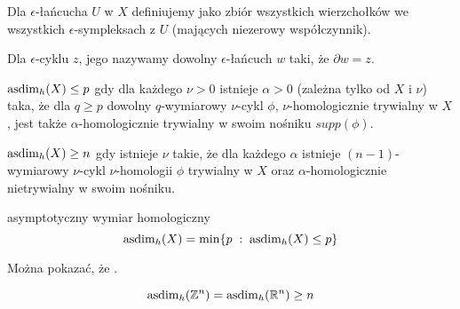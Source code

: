 Dla $\epsilon$-łańcucha $U$ w $X$ definiujemy  jako zbiór wszystkich wierzchołków we wszystkich $\epsilon$-sympleksach z $U$ (mających niezerowy współczynnik).

Dla $\epsilon$-cyklu $z$, jego  nazywamy dowolny $\epsilon$-łańcuch $w$ taki, że $\partial w=z$.



  $\operatorname{asdim}_h(X)\leq p$ gdy dla każdego $\nu>0$ istnieje $\alpha>0$ (zależna tylko od $X$ i $\nu$) taka, że dla $q\geq p$ dowolny $q$-wymiarowy $\nu$-cykl $\phi$, $\nu$-homologicznie trywialny w $X$, jest także $\alpha$-homologicznie trywialny w swoim nośniku $supp(\phi)$.

  $\operatorname{asdim}_h(X)\geq n$ gdy istnieje $\nu$ takie, że dla każdego $\alpha$ istnieje $(n-1)$-wymiarowy $\nu$-cykl $\nu$-homologii $\phi$ trywialny w $X$ oraz $\alpha$-homologicznie nietrywialny w swoim nośniku.

\begin{definition}{asymptotyczny wymiar homologiczny}{}
  $$\operatorname{asdim}_h(X)=\min \{p\;:\;\operatorname{asdim}_h(X)\leq p\}$$
\end{definition}

Można pokazać, że .


\begin{lemma}{}{}
  $$\operatorname{asdim}_h(\mathbb{Z}^n)=\operatorname{asdim}_h(\mathbb{R}^n)\geq n$$
\end{lemma}

